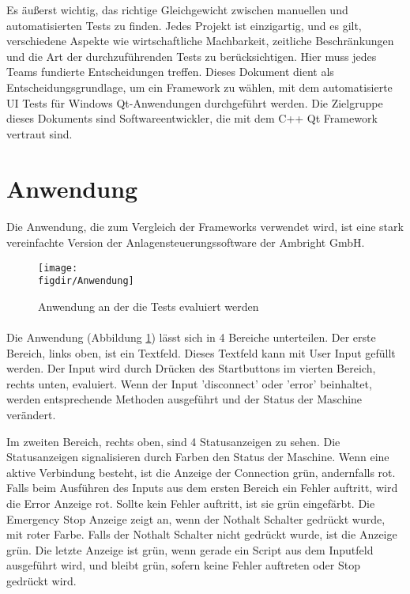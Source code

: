 		
		Es äußerst wichtig, das richtige Gleichgewicht zwischen manuellen und automatisierten Tests zu finden. Jedes Projekt ist einzigartig, und es gilt, verschiedene Aspekte wie wirtschaftliche Machbarkeit, zeitliche Beschränkungen und die Art der durchzuführenden Tests zu berücksichtigen. Hier muss jedes Teams fundierte Entscheidungen treffen. Dieses Dokument dient als Entscheidungsgrundlage, um ein Framework zu wählen, mit dem automatisierte UI Tests für Windows Qt-Anwendungen durchgeführt werden. Die Zielgruppe dieses Dokuments sind Softwareentwickler, die mit dem C++ Qt Framework vertraut sind.
		
	\section{Anwendung}
		\paragraph{} Die Anwendung, die zum Vergleich der Frameworks verwendet wird, ist eine stark vereinfachte Version der Anlagensteuerungssoftware der Ambright GmbH.  
		
		\FloatBarrier
		\begin{figure}[t]		
			\centering
			\texttt{[image: \\figdir/Anwendung]}
				
			\caption[Anwendung]
			{Anwendung an der die Tests evaluiert werden}
			\label{FIG:Anwendung}
		\end{figure}
		\FloatBarrier
		
		\paragraph{} Die Anwendung (Abbildung \ref{FIG:Anwendung}) lässt sich in 4 Bereiche unterteilen. Der erste Bereich, links oben, ist ein Textfeld. Dieses Textfeld kann mit User Input gefüllt werden. Der Input wird durch Drücken des Startbuttons im vierten Bereich, rechts unten, evaluiert. Wenn der Input 'disconnect' oder 'error' beinhaltet, werden entsprechende Methoden ausgeführt und der Status der Maschine verändert.  
		
		Im zweiten Bereich, rechts oben, sind 4 Statusanzeigen zu sehen. Die Statusanzeigen signalisieren durch Farben den Status der Maschine. Wenn eine aktive Verbindung besteht, ist die Anzeige der Connection grün, andernfalls rot.
		Falls beim Ausführen des Inputs aus dem ersten Bereich ein Fehler auftritt, wird die Error Anzeige rot. Sollte kein Fehler auftritt, ist sie grün eingefärbt.
		Die Emergency Stop Anzeige zeigt an, wenn der Nothalt Schalter gedrückt wurde, mit roter Farbe. Falls der Nothalt Schalter nicht gedrückt wurde, ist die Anzeige grün.
		Die letzte Anzeige ist grün, wenn gerade ein Script aus dem Inputfeld ausgeführt wird, und bleibt grün, sofern keine Fehler auftreten oder Stop gedrückt wird.
		
